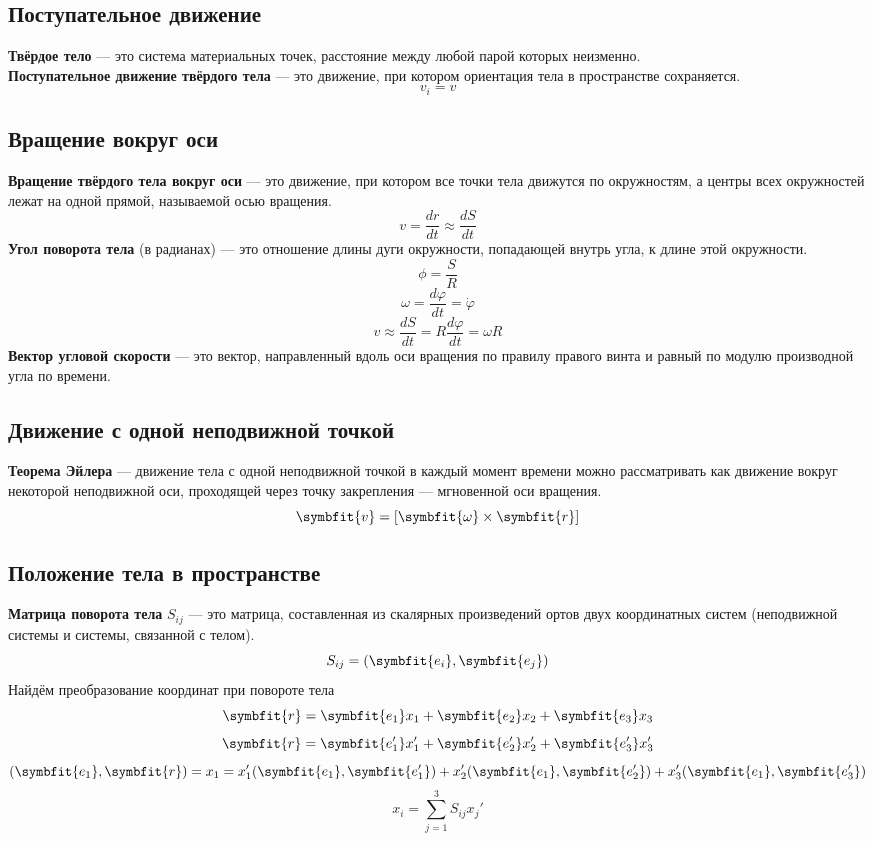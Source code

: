 \documentclass[fleqn,a4paper,12pt,titlepage,finall]{article}
\newcommand\vv[1]{\symbfit{#1}}
\begin{document}
\subsection{Поступательное движение}
{\bf Твёрдое тело} --- это система материальных точек, расстояние между любой
парой которых неизменно. \\
{\bf Поступательное движение твёрдого тела} --- это движение, при котором
ориентация тела в пространстве сохраняется. \\
\[v_i = v\]
\subsection{Вращение вокруг оси}
{\bf Вращение твёрдого тела вокруг оси} --- это движение, при котором все точки
тела движутся по окружностям, а центры всех окружностей лежат на одной прямой,
называемой осью вращения. \\
\[v = \frac{dr}{dt} \approx \frac{dS}{dt}\]
{\bf Угол поворота тела} (в радианах) --- это отношение длины дуги окружности,
попадающей внутрь угла, к длине этой окружности.
\[\phi = \frac{S}{R}\]
\[\omega = \frac{d\varphi}{dt} = \dot{\varphi}\]
\[v \approx \frac{dS}{dt} = R\frac{d\varphi}{dt} = \omega R\]
{\bf Вектор угловой скорости} --- это вектор, направленный вдоль оси вращения по
правилу правого винта и равный по модулю производной угла по времени. \\
\subsection{Движение с одной неподвижной точкой}
{\bf Теорема Эйлера} --- движение тела с одной неподвижной точкой в каждый
момент времени можно рассматривать как движение вокруг некоторой неподвижной
оси, проходящей через точку закрепления --- мгновенной оси вращения.
\[\vv{v} = [\vv{\omega} \times \vv{r}]\]
\subsection{Положение тела в пространстве}
{\bf Матрица поворота тела} $S_{ij}$ --- это матрица, составленная из скалярных
произведений ортов двух координатных систем (неподвижной системы и системы,
связанной с телом).
\[S_{ij} = (\vv{e_i}, \vv{e_j})\]
Найдём преобразование координат при повороте тела
\[\vv{r} = \vv{e_1}x_1 + \vv{e_2}x_2 + \vv{e_3}x_3\]
\[\vv{r} = \vv{e_1'}x_1' + \vv{e_2'}x_2' + \vv{e_3'}x_3'\]
\[(\vv{e_1}, \vv{r}) = x_1 = x_1'(\vv{e_1}, \vv{e_1'}) + x_2'(\vv{e_1},
\vv{e_2'}) + x_3'(\vv{e_1}, \vv{e_3'})\]
\[\boxed{x_i = \sum_{j=1}^3 S_{ij}x_j'}\]
\end{document}
